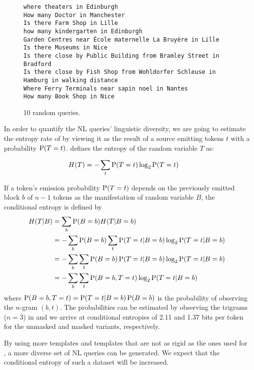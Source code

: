 \begin{figure}[h]
  \centering
  \begin{lstlisting}[style=MyNL]
where theaters in Edinburgh
How many Doctor in Manchester
Is there Farm Shop in Lille
how many kindergarten in Edinburgh
Garden Centres near École maternelle La Bruyère in Lille
Is there Museums in Nice
Is there close by Public Building from Bramley Street in Bradford
Is there close by Fish Shop from Wohldorfer Schleuse in Hamburg in walking distance
Where Ferry Terminals near sapin noel in Nantes
How many Book Shop in Nice
  \end{lstlisting}
  \caption[10 random \nlmapstwo{} queries]{10 random \nlmapstwo{} queries.}
  \label{fig:nlmaps-v2-sample}
\end{figure}

In order to quantify the NL queries’ linguistic diversity, we are going to
estimate the entropy rate of \nlmapstwo{} by viewing it as the result of a
source emitting tokens \(t\) with a probability \(\operatorname*{P}(T=t)\).
\textcite{shannon-1948} defines the entropy of the random variable \(T\) as:

\begin{align}
  H(T) &= - \sum_t \operatorname*{P}(T=t) \log_2 \operatorname*{P}(T=t)
\end{align}

If a token’s emission probability \(\operatorname*{P}(T=t)\) depends on the previously emitted
block \(b\) of \(n-1\) tokens as the manifestation of random variable \(B\), the
conditional entropy is defined by
\begin{align}
  H(T|B) &= \sum_b \operatorname*{P}(B=b) H(T|B=b)\\
         &= - \sum_b \operatorname*{P}(B=b) \sum_t \operatorname*{P}(T=t|B=b) \log_2 \operatorname*{P}(T=t|B=b)\\
         &= - \sum_b \sum_t \operatorname*{P}(B=b) \operatorname*{P}(T=t|B=b) \log_2 \operatorname*{P}(T=t|B=b)\\
         &= - \sum_b \sum_t \operatorname*{P}(B=b, T=t) \log_2 \operatorname*{P}(T=t|B=b)
\end{align}
where \(\operatorname*{P}(B=b, T=t) = \operatorname*{P}(T=t|B=b) \operatorname*{P}(B=b)\) is the probability of observing the
\(n\)-gram \((b, t)\). The probabilities can be estimated by observing the
trigrams (\(n=3\)) in \nlmapstwo{} and we arrive at conditional entropies of
\num{2.11} and \num{1.37} bits per token for the unmasked and masked variants,
respectively.

By using more templates and templates that are not as rigid as the ones used for
\nlmapstwo{}, a more diverse set of NL queries can be generated. We expect that
the conditional entropy of such a dataset will be increased.

